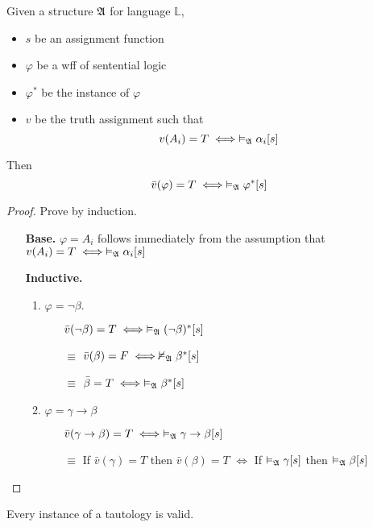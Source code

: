 \begin{lemma}
    Given a structure $\mathfrak{A}$ for language $\mathbb{L}$,
    \begin{itemize}
        \item $s$ be an assignment function
        \item $\varphi$ be a wff of sentential logic
        \item $\varphi^\ast$ be the instance of $\varphi$
        \item $v$ be the truth assignment such that
        \[ v(A_i) = T \iff \vDash_{\mathfrak{A}}\alpha_i[s] \]
    \end{itemize}
    Then
    \[ \bar{v}(\varphi) = T \iff \vDash_{\mathfrak{A}}\varphi^\ast[s] \]
\end{lemma}
\begin{proof}
    Prove by induction.
    \begin{itemize}
        \item[] \textbf{Base.} $\varphi = A_i$ follows immediately from the assumption that $v(A_i) = T \iff \vDash_{\mathfrak{A}}\alpha_i[s]$
        \item[] \textbf{Inductive.} \begin{enumerate}
            \item $\varphi = \neg \beta$.
            \begin{itemize}
                \item[] $\bar{v}(\neg\beta) = T \iff \vDash_{\mathfrak{A}}(\neg\beta)^\ast[s]$
                \item[$\equiv$] $\bar{v}(\beta) = F \iff \nvDash_{\mathfrak{A}}\beta^\ast[s]$ 
                \item[$\equiv$] $\bar{\beta} = T \iff \vDash_{\mathfrak{A}}\beta^\ast[s]$
            \end{itemize}
            \item $\varphi = \gamma \to \beta$
            \begin{itemize}
                \item[] $\bar{v}(\gamma\to\beta) = T \iff \vDash_{\mathfrak{A}}\gamma\to\beta[s]$
                \item[$\equiv$] If $\bar{v}(\gamma) = T$ then $\bar{v}(\beta) = T$ $\iff$ If $\vDash_{\mathfrak{A}}\gamma[s]$ then $\vDash_{\mathfrak{A}}\beta[s]$ 
            \end{itemize}
        \end{enumerate}
    \end{itemize}
\end{proof}

\begin{corollary}
    Every instance of a tautology is valid.
\end{corollary}
